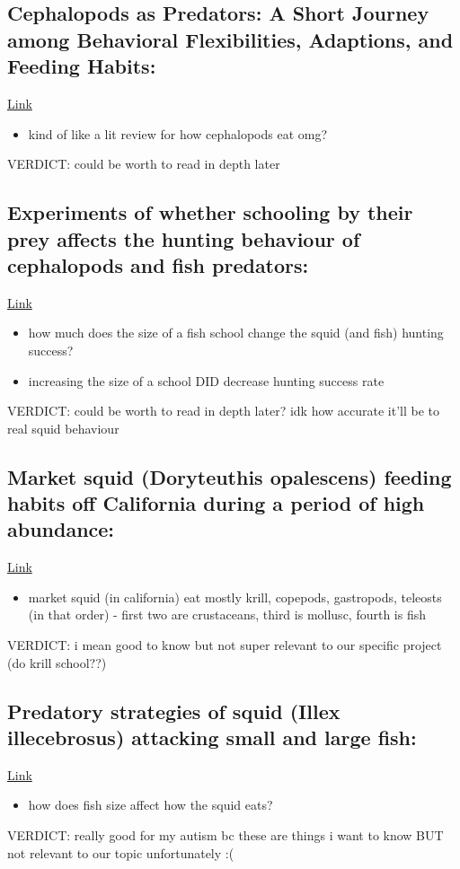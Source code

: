 \documentclass[12pt]{article}
\begin{document}
\subsection{Cephalopods as Predators: A Short Journey among Behavioral Flexibilities, Adaptions, and Feeding Habits: \cite{villanueva}}
\href{https://doi.org/10.3389/fphys.2017.00598}{Link}
\begin{itemize}
    \item kind of like a lit review for how cephalopods eat omg?
\end{itemize}
VERDICT: could be worth to read in depth later

\subsection{Experiments of whether schooling by their prey affects the hunting behaviour of cephalopods and fish predators: \cite{neill}}
\href{https://doi.org/10.1111/j.1469-7998.1974.tb04385.x}{Link}
\begin{itemize}
    \item how much does the size of a fish school change the squid (and fish) hunting success?
    \item increasing the size of a school DID decrease hunting success rate
\end{itemize}
VERDICT: could be worth to read in depth later? idk how accurate it'll be to real squid behaviour

\subsection{Market squid (Doryteuthis opalescens) feeding habits off California during a period of high abundance: \cite{noord}}
\href{https://doi.org/10.1016/j.ecss.2026.109761}{Link}
\begin{itemize}
    \item market squid (in california) eat mostly krill, copepods, gastropods, teleosts (in that order) - first two are crustaceans, third is mollusc, fourth is fish
\end{itemize}
VERDICT: i mean good to know but not super relevant to our specific project (do krill school??)

\subsection{Predatory strategies of squid (Illex illecebrosus) attacking small and large fish: \cite{foyle}}
\href{https://doi.org/10.1080/10236248809378670}{Link}
\begin{itemize}
    \item how does fish size affect how the squid eats?
\end{itemize}
VERDICT: really good for my autism bc these are things i want to know BUT not relevant to our topic unfortunately :(
\end{document}
